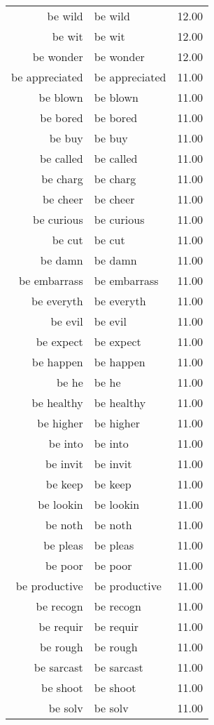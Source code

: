 \begin{table}[ht]
\begin{tabular}{rlr}
  be wild & be wild & 12.00 \\ 
  be wit & be wit & 12.00 \\ 
  be wonder & be wonder & 12.00 \\ 
  be appreciated & be appreciated & 11.00 \\ 
  be blown & be blown & 11.00 \\ 
  be bored & be bored & 11.00 \\ 
  be buy & be buy & 11.00 \\ 
  be called & be called & 11.00 \\ 
  be charg & be charg & 11.00 \\ 
  be cheer & be cheer & 11.00 \\ 
  be curious & be curious & 11.00 \\ 
  be cut & be cut & 11.00 \\ 
  be damn & be damn & 11.00 \\ 
  be embarrass & be embarrass & 11.00 \\ 
  be everyth & be everyth & 11.00 \\ 
  be evil & be evil & 11.00 \\ 
  be expect & be expect & 11.00 \\ 
  be happen & be happen & 11.00 \\ 
  be he & be he & 11.00 \\ 
  be healthy & be healthy & 11.00 \\ 
  be higher & be higher & 11.00 \\ 
  be into & be into & 11.00 \\ 
  be invit & be invit & 11.00 \\ 
  be keep & be keep & 11.00 \\ 
  be lookin & be lookin & 11.00 \\ 
  be noth & be noth & 11.00 \\ 
  be pleas & be pleas & 11.00 \\ 
  be poor & be poor & 11.00 \\ 
  be productive & be productive & 11.00 \\ 
  be recogn & be recogn & 11.00 \\ 
  be requir & be requir & 11.00 \\ 
  be rough & be rough & 11.00 \\ 
  be sarcast & be sarcast & 11.00 \\ 
  be shoot & be shoot & 11.00 \\ 
  be solv & be solv & 11.00 \\ 

\end{tabular}
\end{table}

